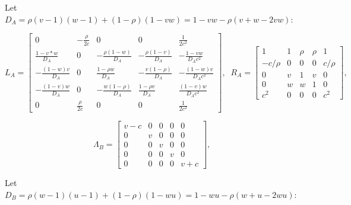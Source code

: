 \documentclass{article}
\begin{document}
Let $D_A=\rho (v-1) (w-1) + (1-\rho) (1-vw) = 1-vw -\rho(v+w-2vw)$:

\begin{equation}
L_A = \left[
    \begin{array}{ccccc}
      0                  & -\frac{\rho}{2c} & 0  & 0              & \frac{1}{2c^2}\\
      \frac{1-v*w}{D_A} & 0 & -\frac{\rho (1-w)}{D_A} & -\frac{\rho (1-v)}{D_A} & -\frac{1 -v w}{D_A c^2}\\
      -\frac{(1-w) v}{D_A} & 0 & \frac{1-\rho w}{D_A}  &  -\frac{v (1-\rho)}{D_A} & -\frac{(1 - w) v}{D_A c^2}\\
      -\frac{(1-v)w}{D_A} & 0 &  -\frac{w (1-\rho)}{D_A} & \frac{1-\rho v}{D_A} &  \frac{(1-v)w}{D_A c^2} \\
      0 & \frac{\rho}{2c}  & 0 & 0               & \frac{1}{2c^2}
    \end{array}
  \right],\;\;
  R_A = \left[
    \begin{array}{ccccc}
      1       & 1 & \rho & \rho & 1 \\
      -c/\rho & 0 & 0    & 0    & c/\rho \\
      0       & v & 1    & v    & 0 \\
      0       & w & w    & 1    & 0 \\
      c^2     & 0 & 0    & 0    & c^2
    \end{array}
  \right],\;\;
\end{equation}

\begin{equation}
  \Lambda_B = \left[
    \begin{array}{ccccc}
      v-c& 0 & 0 & 0 & 0\\
      0  & v & 0 & 0 & 0\\
      0  & 0 & v & 0 & 0\\
      0  & 0 & 0 & v & 0\\
      0  & 0 & 0 & 0 & v+c
    \end{array}
  \right],\;\;
\end{equation}

Let $D_B=\rho (w-1) (u-1) + (1-\rho) (1-wu) = 1-wu -\rho(w+u-2wu)$:
\end{document}
